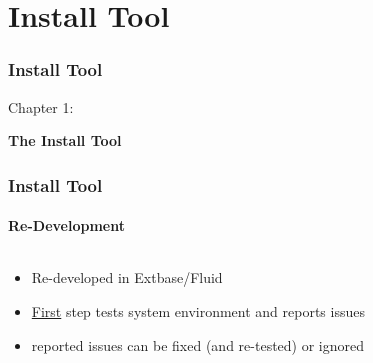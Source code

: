 %
%
%
%


\section{Install Tool}
\begin{frame}[fragile]
	\frametitle{Install Tool}

	\begin{center}\huge{Chapter 1:}\end{center}
	\begin{center}\huge{\color{typo3darkgrey}\textbf{The Install Tool}}\end{center}

\end{frame}


\begin{frame}[fragile]
	\frametitle{Install Tool}
	\framesubtitle{Re-Development}

	\begin{columns}[T]

		\begin{column}{.5\textwidth}
			\begin{itemize}
				\item Re-developed in Extbase/Fluid
				\item \underline{First} step tests system environment and reports issues
				\item reported issues can be fixed\newline
					(and re-tested) or ignored
			\end{itemize}
		\end{column}

		\begin{column}{.5\textwidth}
		\end{column}

	\end{columns}

\end{frame}

